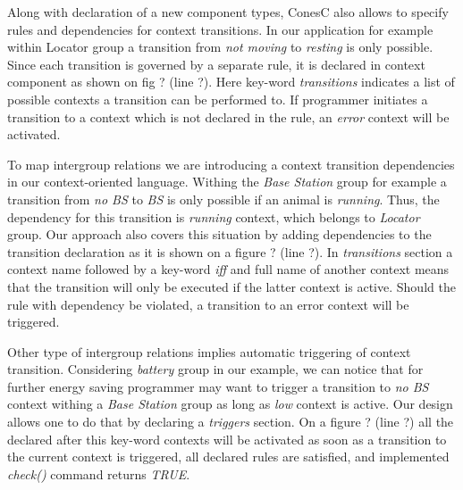 Along with declaration of a new component types, ConesC also allows to specify rules and dependencies for context transitions. In our application for example within Locator group a transition from \emph{not moving} to \emph{resting} is only possible. Since each transition is governed by a separate rule, it is declared in context component as shown on fig ? (line ?). Here key-word \emph{transitions} indicates a list of possible contexts a transition can be performed to. If programmer initiates a transition to a context which is not declared in the rule, an \emph{error} context will be activated.

To map intergroup relations we are introducing a context transition dependencies in our context-oriented language. Withing the \emph{Base Station} group for example a transition from \emph{no BS} to \emph{BS} is only possible if an animal is \emph{running}. Thus, the dependency for this transition is \emph{running} context, which belongs to \emph{Locator} group. Our approach also covers this situation by adding dependencies to the transition declaration as it is shown on a figure ? (line ?). In \emph{transitions} section a context name followed by a key-word \emph{iff} and full name of another context means that the transition will only be executed if the latter context is active. Should the rule with dependency be violated, a transition to an error context will be triggered.

Other type of intergroup relations implies automatic triggering of context transition. Considering \emph{battery} group in our example, we can notice that for further energy saving programmer may want to trigger a transition to \emph{no BS} context withing a \emph{Base Station} group as long as \emph{low} context is active. Our design allows one to do that by declaring a \emph{triggers} section. On a figure ? (line ?) all the declared after this key-word contexts will be activated as soon as a transition to the current context is triggered, all declared rules are satisfied, and implemented \emph{check()} command returns \emph{TRUE}.